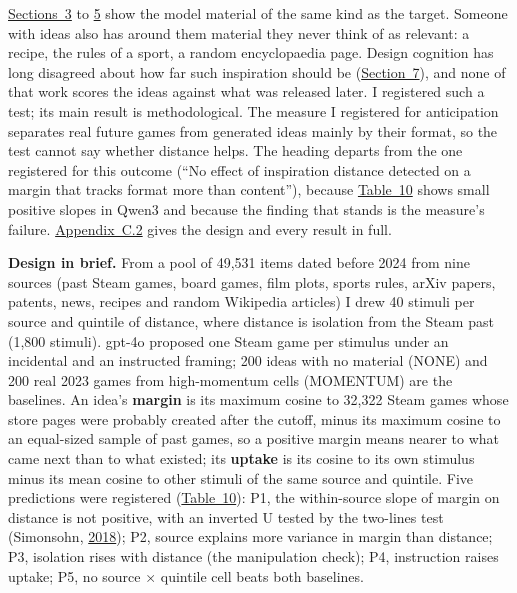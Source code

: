 \documentclass[
  10pt,
]{article}
\begin{document}
\hyperref[sec:3]{Sections~3} to
\hyperref[sec:5]{5} show the model
material of the same kind as the target.
Someone with ideas also has around them
material they never think of as
relevant: a recipe, the rules of a
sport, a random encyclopaedia page.
Design cognition has long disagreed
about how far such inspiration should be
(\hyperref[sec:7]{Section~7}), and none
of that work scores the ideas against
what was released later. I registered
such a test; its main result is
methodological. The measure I registered
for anticipation separates real future
games from generated ideas mainly by
their format, so the test cannot say
whether distance helps. The heading
departs from the one registered for this
outcome (``No effect of inspiration
distance detected on a margin that
tracks format more than content''),
because \hyperref[tab:10]{Table~10}
shows small positive slopes in Qwen3 and
because the finding that stands is the
measure's failure.
\hyperref[app:C.2]{Appendix~C.2} gives
the design and every result in full.

\textbf{Design in brief.} From a pool of
49,531 items dated before 2024 from nine
sources (past Steam games, board games,
film plots, sports rules, arXiv papers,
patents, news, recipes and random
Wikipedia articles) I drew 40 stimuli
per source and quintile of distance,
where distance is isolation from the
Steam past (1,800 stimuli). gpt-4o
proposed one Steam game per stimulus
under an incidental and an instructed
framing; 200 ideas with no material
(NONE) and 200 real 2023 games from
high-momentum cells (MOMENTUM) are the
baselines. An idea's \textbf{margin} is
its maximum cosine to 32,322 Steam games
whose store pages were probably created
after the cutoff, minus its maximum
cosine to an equal-sized sample of past
games, so a positive margin means nearer
to what came next than to what existed;
its \textbf{uptake} is its cosine to its
own stimulus minus its mean cosine to
other stimuli of the same source and
quintile. Five predictions were
registered
(\hyperref[tab:10]{Table~10}): P1, the
within-source slope of margin on
distance is not positive, with an
inverted U tested by the two-lines test
(Simonsohn,
\hyperlink{ref-Simonsohn2018}{2018});
P2, source explains more variance in
margin than distance; P3, isolation
rises with distance (the manipulation
check); P4, instruction raises uptake;
P5, no source × quintile cell beats both
baselines.
\end{document}
